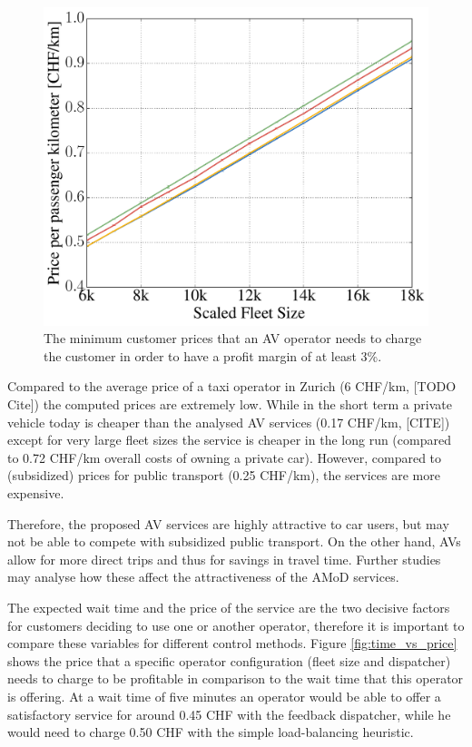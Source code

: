 \begin{figure}
\includegraphics[width=1.0\textwidth]{figures/01_passenger_price.pdf}
\caption{The minimum customer prices that an AV operator needs to charge the customer
in order to have a profit margin of at least 3\%.}
\label{fig:passenger_price}
\end{figure}

Compared to the average price of a taxi operator in Zurich (6 CHF/km, [TODO Cite])
the computed prices are extremely low. While in the short term a
private vehicle today is cheaper than the analysed AV services (0.17 CHF/km, [CITE])
except for very large fleet sizes the service is cheaper in the long run (compared
to 0.72 CHF/km overall costs of owning a private car). However, compared to
(subsidized) prices for public transport (0.25 CHF/km), the services are more
expensive.

Therefore, the proposed AV services are highly attractive to car users, but may
not be able to compete with subsidized public transport. On the other hand, AVs
allow for more direct trips and thus for savings in travel time. Further studies
may analyse how these affect the attractiveness of the AMoD services.

The expected wait time and the price of the service are the two decisive factors for customers deciding to use one or another operator, therefore it is important to compare these variables for different control methods. Figure \ref{fig:time_vs_price} shows the price that a specific operator configuration (fleet size and dispatcher)
needs to charge to be profitable in comparison to the wait time that this operator is offering. At a wait time of five minutes an operator would be able to offer a satisfactory service for around 0.45 CHF with the feedback dispatcher, while he would need to charge 0.50 CHF with the simple load-balancing heuristic. 

